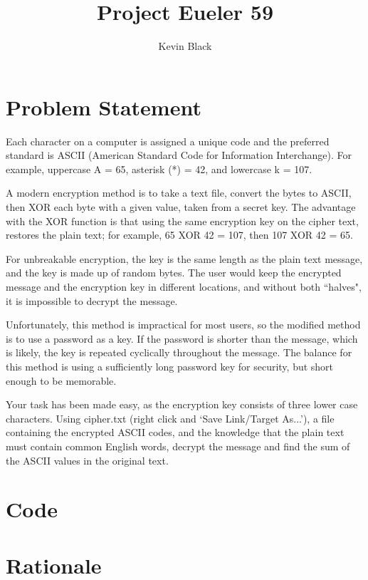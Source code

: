 \documentclass[11pt]{amsart}
\title{\vspace{-1.5cm}Project Eueler 59}
\author{Kevin Black}
\begin{document}
\maketitle

\section{Problem Statement}

Each character on a computer is assigned a unique code and the preferred standard is ASCII (American Standard Code for Information Interchange). For example, uppercase A = 65, asterisk (*) = 42, and lowercase k = 107.

A modern encryption method is to take a text file, convert the bytes to ASCII, then XOR each byte with a given value, taken from a secret key. The advantage with the XOR function is that using the same encryption key on the cipher text, restores the plain text; for example, 65 XOR 42 = 107, then 107 XOR 42 = 65.

For unbreakable encryption, the key is the same length as the plain text message, and the key is made up of random bytes. The user would keep the encrypted message and the encryption key in different locations, and without both ``halves", it is impossible to decrypt the message.

Unfortunately, this method is impractical for most users, so the modified method is to use a password as a key. If the password is shorter than the message, which is likely, the key is repeated cyclically throughout the message. The balance for this method is using a sufficiently long password key for security, but short enough to be memorable.

Your task has been made easy, as the encryption key consists of three lower case characters. Using cipher.txt (right click and `Save Link/Target As...'), a file containing the encrypted ASCII codes, and the knowledge that the plain text must contain common English words, decrypt the message and find the sum of the ASCII values in the original text.

\section{Code}


\section{Rationale}
\end{document}
